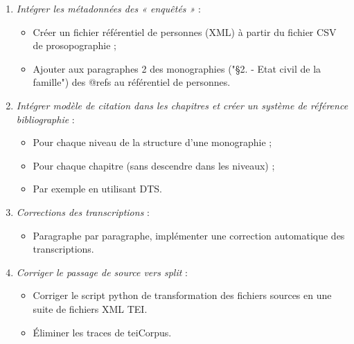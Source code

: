 \begin{enumerate}
    \item \textit{Intégrer les métadonnées des « enquêtés »} :
    \begin{itemize}
        \item  Créer un fichier référentiel de personnes (XML) à partir du fichier CSV de prosopographie ;
        \item  Ajouter aux paragraphes 2 des monographies ("§2. - Etat civil de la famille") des @refs au référentiel de personnes.
    \end{itemize}

    \item \textit{Intégrer modèle de citation dans les chapitres et créer un système de référence bibliographie   } :
    \begin{itemize}
        \item  Pour chaque niveau de la structure d'une monographie  ;
        \item  Pour chaque chapitre (sans descendre dans les niveaux) ;
        \item  Par exemple en utilisant DTS.
    \end{itemize}

    \item \textit{Corrections des transcriptions} :
    \begin{itemize}
        \item  Paragraphe par paragraphe, implémenter une correction automatique des transcriptions.
    \end{itemize}

    \item \textit{Corriger le passage de source vers split} :
    \begin{itemize}
        \item  Corriger le script python de transformation des fichiers sources en une suite de fichiers XML TEI.
        \item  Éliminer les traces de teiCorpus.
    \end{itemize}


\end{enumerate}
